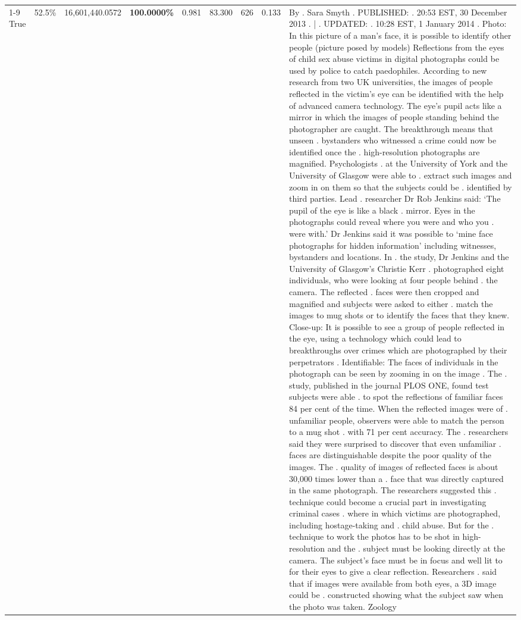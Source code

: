 \begin{table}[H]
\begin{tabular}{lllrlllll}
\cline{1-9} \cline{2-9}
True & 52.5\% & 16,601,440.0572 & \bfseries \color{red} 100.0000\% & 0.981 & 83.300 & 626 & 0.133 & By . Sara Smyth . PUBLISHED: . 20:53 EST, 30 December 2013 . | . UPDATED: . 10:28 EST, 1 January 2014 . Photo: In this picture of a man's face, it is possible to identify other people (picture posed by models) Reflections from the eyes of child sex abuse victims in digital photographs could be used by police to catch paedophiles. According to new research from two UK universities, the images of people reflected in the victim's eye can be identified with the help of advanced camera technology. The eye's pupil acts like a mirror in which the images of people standing behind the photographer are caught. The breakthrough means that unseen . bystanders who witnessed a crime could now be identified once the . high-resolution photographs are magnified. Psychologists . at the University of York and the University of Glasgow were able to . extract such images and zoom in on them so that the subjects could be . identified by third parties. Lead . researcher Dr Rob Jenkins said: ‘The pupil of the eye is like a black . mirror. Eyes in the photographs could reveal where you were and who you . were with.' Dr Jenkins said it was possible to ‘mine face photographs for hidden information' including witnesses, bystanders and locations. In . the study, Dr Jenkins and the University of Glasgow's Christie Kerr . photographed eight individuals, who were looking at four people behind . the camera. The reflected . faces were then cropped and magnified and subjects were asked to either . match the images to mug shots or to identify the faces that they knew. Close-up: It is possible to see a group of people reflected in the eye, using a technology which could lead to breakthroughs over crimes which are photographed by their perpetrators . Identifiable: The faces of individuals in the photograph can be seen by zooming in on the image . The . study, published in the journal PLOS ONE, found test subjects were able . to spot the reflections of familiar faces 84 per cent of the time. When the reflected images were of . unfamiliar people, observers were able to match the person to a mug shot . with 71 per cent accuracy. The . researchers said they were surprised to discover that even unfamiliar . faces are distinguishable despite the poor quality of the images. The . quality of images of reflected faces is about 30,000 times lower than a . face that was directly captured in the same photograph. The researchers suggested this . technique could become a crucial part in investigating criminal cases . where in which victims are photographed, including hostage-taking and . child abuse. But for the . technique to work the photos has to be shot in high-resolution and the . subject must be looking directly at the camera. The subject's face must be in focus and well lit to for their eyes to give a clear reflection. Researchers . said that if images were available from both eyes, a 3D image could be . constructed showing what the subject saw when the photo was taken. Zoology \\

\end{tabular}
\end{table}
